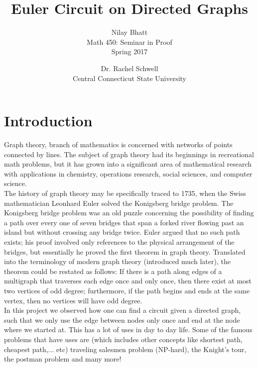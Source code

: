 \documentclass[17pt]{article}
\begin{document}
\title{Euler Circuit on Directed Graphs}
\author{Nilay Bhatt \\ Math 450: Seminar in Proof \\ Spring 2017}
\date{Dr. Rachel Schwell \\ Central Connecticut State University}
\maketitle

\newpage 
\tableofcontents

\newpage
 \vspace*{\fill}
 \vspace*{\fill}
\newpage

\section{Introduction}

	Graph theory, branch of mathematics is concerned with networks of points connected by lines. The subject of graph theory had its beginnings in recreational math problems, but it has grown into a significant area of mathematical research with applications in chemistry, operations research, social sciences, and computer science.\\The history of graph theory may be specifically traced to 1735, when the Swiss mathematician Leonhard Euler solved the Konigsberg bridge problem. The Konigsberg bridge problem was an old puzzle concerning the possibility of finding a path over every one of seven bridges that span a forked river flowing past an island but without crossing any bridge twice. Euler argued that no such path exists; his proof involved only references to the physical arrangement of the bridges, but essentially he proved the first theorem in graph theory. Translated into the terminology of modern graph theory (introduced much later), the theorem could be restated as follows: If there is a path along edges of a multigraph that traverses each edge once and only once, then there exist at most two vertices of odd degree; furthermore, if the path begins and ends at the same vertex, then no vertices will have odd degree.\\ In this project we observed how one can find a circuit given a directed graph, such that we only use the edge between nodes only once and end at the node where we started at. This has a lot of uses in day to day life. Some of the famous problems that have uses are (which includes other concepts like shortest path, cheapest path,... etc) traveling salesmen problem (NP-hard), the Knight's tour, the postman problem and many more! 
\end{document}
